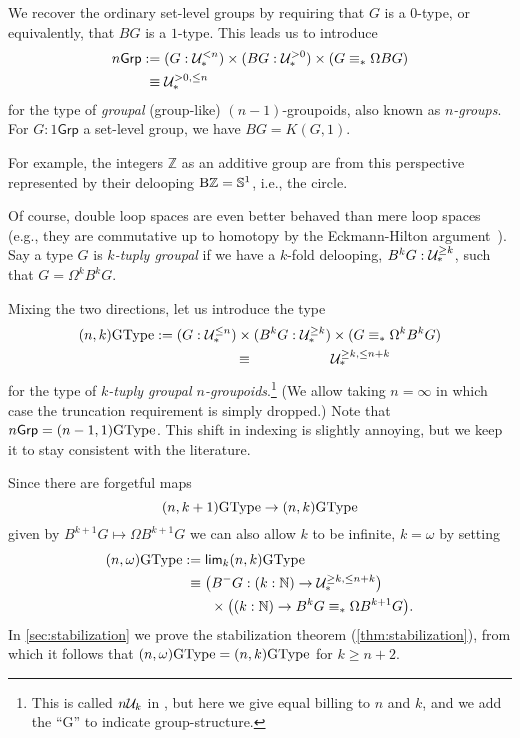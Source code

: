 We recover the ordinary set-level
groups by requiring that $G$ is a $0$-type, or equivalently, that $BG$
is a $1$-type. This leads us to introduce
\begin{align*}
  n\mathsf{Grp}
  &:= (G : \mathcal{U}_\ast^{<n}) \times (BG : \mathcal{U}_\ast^{>0})
    \times (G \equiv_\ast \Omega BG) \\
  &\phantom{:}\equiv \mathcal{U}_\ast^{>0,\le n}
\end{align*}
for the type of \emph{groupal} (group-like) $(n-1)$-groupoids, also known
as \emph{$n$-groups}. For $G:1\mathsf{Grp}$
a set-level group, we have $BG = K(G,1)$.

For example, the integers $\mathbb{Z}$ as an additive group are from this
perspective represented by their delooping $\mathop{\mathrm{B}\mathbb{Z}}={\mathbb{S}}^1$, i.e., the circle.

Of course, double loop spaces are even better behaved than mere loop
spaces (e.g., they are commutative up to homotopy
by the Eckmann-Hilton argument~\cite[Theorem~2.1.6]{hottbook}).
Say a type $G$ is
\emph{$k$-tuply groupal} if we have a $k$-fold delooping,
$B^kG : \mathcal{U}_\ast^{\ge k}$, such that $G = \Omega^kB^kG$.

Mixing the two directions, let us introduce the type
\begin{align*}
  (n,k)\GType
  &:= (G : \UU_\pt^{\le n}) \times (B^kG : \UU_\pt^{\ge k})
    \times (G \equiv_\pt \Omega^kB^kG) \\
  &\omit$\phantom{:}\equiv \UU_\pt^{\ge k,\le n+k}$
\end{align*}
for the type of \emph{$k$-tuply groupal $n$-groupoids}.\footnote{This
  is called $n\mathcal{U}_k$ in \cite{BaezDolan1998}, but here we give equal
  billing to $n$ and $k$,
  and we add the ``G'' to indicate group-structure.}
(We allow taking $n=\infty$ in which case the truncation requirement
is simply dropped.)
Note that $n\mathsf{Grp} = (n-1,1)\mathrm{GType}$. This shift in indexing is slightly
annoying, but we keep it to stay consistent with the literature.

Since there are forgetful maps
\begin{equation*}
(n,k+1)\mathrm{GType} \to (n,k)\mathrm{GType}
\end{equation*}
given by $B^{k+1}G\mapsto \Omega B^{k+1}G$
we can also allow $k$ to be infinite, $k=\omega$ by setting
\begin{align*}
(n,\omega)\mathrm{GType} & := \mathsf{lim}_k{}(n,k)\mathrm{GType} \\
&\phantom{:}\equiv \bigl(B^{-}G : (k : {\mathbb{N}}) \to \mathcal{U}_\ast^{\ge k,\le n+k}\bigr) \\
  &\qquad \times \bigl((k : {\mathbb{N}}) \to B^kG \equiv_\ast \Omega B^{k+1}G \bigr).
\end{align*}
In \autoref{sec:stabilization} we prove the stabilization theorem
(\autoref{thm:stabilization}), from which it follows that
$(n,\omega)\mathrm{GType}=(n,k)\mathrm{GType}$ for $k\geq n+2$.

